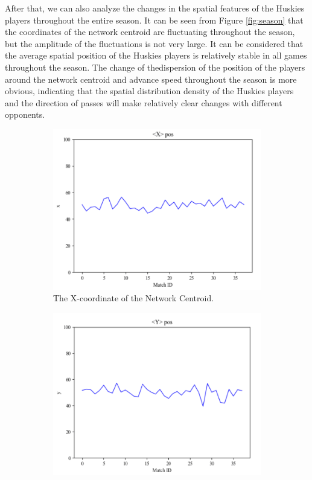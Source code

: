 \documentclass{mcmthesis}
\begin{document}
	After that, we can also analyze the changes in the spatial features of the Huskies players throughout the entire season.  It can be seen from Figure \ref{fig:season} that the coordinates of the network centroid are fluctuating throughout the season, but the amplitude of the fluctuations is not very large. It can be considered that the average spatial position of the Huskies players is relatively stable in all games throughout the season.  The change of thedispersion of the position of the players around the network centroid and advance speed throughout the season is more obvious, indicating that the spatial distribution density of the Huskies players and the direction of passes will make relatively clear changes with different opponents.

	\begin{figure}[h]
		\centering
		\begin{subfigure}[b]{0.5\textwidth}
			\includegraphics[width=\textwidth]{figures/xc2.png}
			\caption{The X-coordinate of the Network Centroid.}
			\label{fig:x2}
		\end{subfigure}%
		\begin{subfigure}[b]{0.5\textwidth}
			\includegraphics[width=\textwidth]{figures/yc2.png}

\end{subfigure}
\end{figure}
\end{document}
